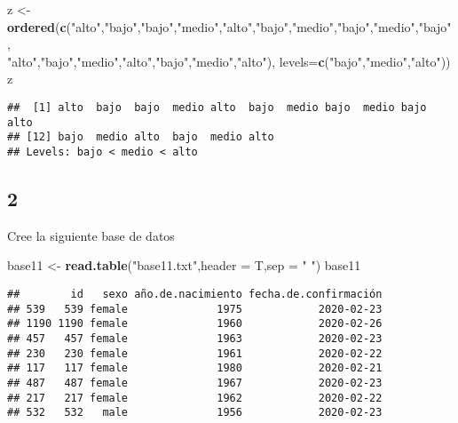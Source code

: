 \documentclass[]{article}
\newenvironment{Shaded}{\begin{snugshade}}{\end{snugshade}}
\newcommand{\KeywordTok}[1]{\textcolor[rgb]{0.13,0.29,0.53}{\textbf{#1}}}
\newcommand{\DataTypeTok}[1]{\textcolor[rgb]{0.13,0.29,0.53}{#1}}
\newcommand{\StringTok}[1]{\textcolor[rgb]{0.31,0.60,0.02}{#1}}
\newcommand{\NormalTok}[1]{#1}
\begin{document}
\begin{Shaded}
\begin{Highlighting}[]
\NormalTok{z <-}\StringTok{ }\KeywordTok{ordered}\NormalTok{(}\KeywordTok{c}\NormalTok{(}\StringTok{"alto"}\NormalTok{,}\StringTok{"bajo"}\NormalTok{,}\StringTok{"bajo"}\NormalTok{,}\StringTok{"medio"}\NormalTok{,}\StringTok{"alto"}\NormalTok{,}\StringTok{"bajo"}\NormalTok{,}\StringTok{"medio"}\NormalTok{,}\StringTok{"bajo"}\NormalTok{,}\StringTok{"medio"}\NormalTok{,}\StringTok{"bajo"}\NormalTok{,}\\
\StringTok{"alto"}\NormalTok{,}\StringTok{"bajo"}\NormalTok{,}\StringTok{"medio"}\NormalTok{,}\StringTok{"alto"}\NormalTok{,}\StringTok{"bajo"}\NormalTok{,}\StringTok{"medio"}\NormalTok{,}\StringTok{"alto"}\NormalTok{),}
\DataTypeTok{levels=}\KeywordTok{c}\NormalTok{(}\StringTok{"bajo"}\NormalTok{,}\StringTok{"medio"}\NormalTok{,}\StringTok{"alto"}\NormalTok{))}
\NormalTok{z}
\end{Highlighting}
\end{Shaded}

\begin{verbatim}
##  [1] alto  bajo  bajo  medio alto  bajo  medio bajo  medio bajo  alto 
## [12] bajo  medio alto  bajo  medio alto 
## Levels: bajo < medio < alto
\end{verbatim}

\subsection{2}\label{section-1}

Cree la siguiente base de datos

\begin{Shaded}
\begin{Highlighting}[]
\NormalTok{base11 <-}\StringTok{ }\KeywordTok{read.table}\NormalTok{(}\StringTok{"base11.txt"}\NormalTok{,}\DataTypeTok{header =}\NormalTok{ T,}\DataTypeTok{sep =} \StringTok{" "}\NormalTok{)}
\NormalTok{base11}
\end{Highlighting}
\end{Shaded}

\begin{verbatim}
##        id   sexo año.de.nacimiento fecha.de.confirmación
## 539   539 female              1975            2020-02-23
## 1190 1190 female              1960            2020-02-26
## 457   457 female              1963            2020-02-23
## 230   230 female              1961            2020-02-22
## 117   117 female              1980            2020-02-21
## 487   487 female              1967            2020-02-23
## 217   217 female              1962            2020-02-22
## 532   532   male              1956            2020-02-23
\end{verbatim}
\end{document}
